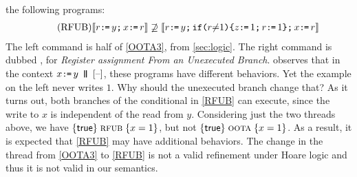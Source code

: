 \citet{BoehmOOTA}  the following programs:
\begin{gather*}
  \tag{RFUB}\label{RFUB}
  \llbracket r\texttt{:}\mkern-1mu\texttt{=}\, y\texttt{;}\,\allowbreak x\texttt{:}\mkern-1mu\texttt{=}\, r\rrbracket
  \not\supseteq
  \llbracket r\texttt{:}\mkern-1mu\texttt{=}\, y\texttt{;}\,\allowbreak \texttt{if}\allowbreak\texttt{(}r {\neq} 1\texttt{)} \allowbreak\texttt{\{} z\texttt{:}\mkern-1mu\texttt{=}\, 1\texttt{;}\,\allowbreak r\texttt{:}\mkern-1mu\texttt{=}\, 1\texttt{\}} \texttt{;}\,\allowbreak x\texttt{:}\mkern-1mu\texttt{=}\, r\rrbracket
\end{gather*}
The left command is half of \ref{OOTA3}, from
\textsection\ref{sec:logic}.  The right command is dubbed \rfub{}, for
\emph{Register assignment From an Unexecuted Branch}.
\citeauthor{BoehmOOTA} observes that in the context $x\GETS y \PAR \hole{}$,
these programs have different behaviors.  Yet the \oota{} example on the left
never writes $1$.  Why should the unexecuted branch change that?  As it turns
out, both branches of the conditional in \ref{RFUB} can execute, since the write
to $x$ is independent of the read from $y$.  Considering just the two threads
above, we have $\{\mathsf{true}\}\allowbreak\;\text{{\sc rfub}}\;\allowbreak\{x=1\}$, but not
$\{\mathsf{true}\}\allowbreak\;\text{{\sc oota}}\;\allowbreak\{x=1\}$.  As a result, it is expected that \ref{RFUB}
may have additional behaviors.  The change in the thread from \ref{OOTA3} to
\ref{RFUB} is not a valid refinement under Hoare logic and thus it is not valid
in our semantics.

